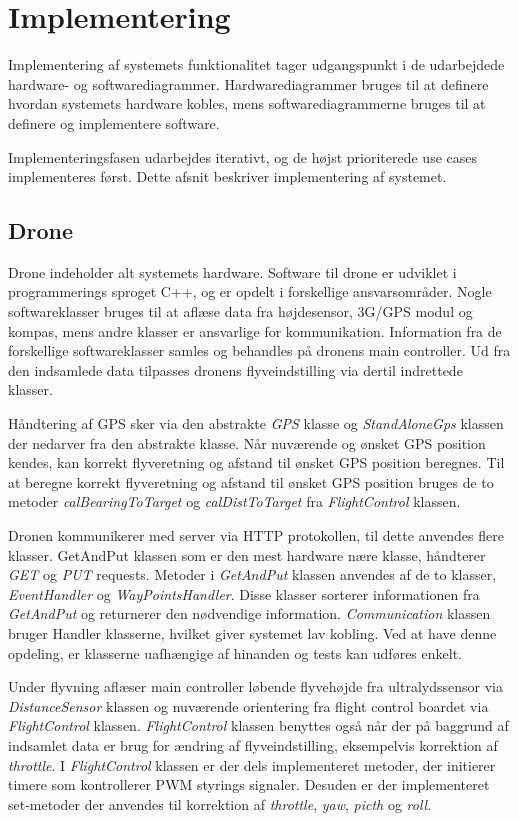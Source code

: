 \section{Implementering}
Implementering af systemets funktionalitet tager udgangspunkt i de udarbejdede hardware- og softwarediagrammer. Hardwarediagrammer bruges til at definere hvordan systemets hardware kobles, mens softwarediagrammerne bruges til at definere og implementere software.

Implementeringsfasen udarbejdes iterativt, og de højst prioriterede use cases implementeres først. 
Dette afsnit beskriver implementering af systemet.

\subsection{Drone}
Drone indeholder alt systemets hardware. Software til drone er udviklet i programmerings sproget C++, og er opdelt i forskellige ansvarsområder. Nogle softwareklasser bruges til at aflæse data fra højdesensor, 3G/GPS modul og kompas, mens andre klasser er ansvarlige for kommunikation. Information fra de forskellige softwareklasser samles og behandles på dronens main controller. Ud fra den indsamlede data tilpasses dronens flyveindstilling via dertil indrettede klasser. 

Håndtering af GPS sker via den abstrakte \textit{GPS} klasse og \textit{StandAloneGps} klassen der nedarver fra den abstrakte klasse. Når nuværende og ønsket GPS position kendes, kan korrekt flyveretning og afstand til ønsket GPS position beregnes. Til at beregne korrekt flyveretning og afstand til ønsket GPS position bruges de to metoder \textit{calBearingToTarget} og \textit{calDistToTarget} fra \textit{FlightControl} klassen. 

Dronen kommunikerer med server via HTTP protokollen, til dette anvendes flere klasser. GetAndPut klassen som er den mest hardware nære klasse, håndterer \textit{GET} og \textit{PUT} requests. Metoder i \textit{GetAndPut} klassen anvendes af de to klasser, \textit{EventHandler} og \textit{WayPointsHandler}. Disse klasser sorterer informationen fra \textit{GetAndPut} og returnerer den nødvendige information. \textit{Communication} klassen bruger Handler klasserne, hvilket giver systemet lav kobling. Ved at have denne opdeling, er klasserne uafhængige af hinanden og tests kan udføres enkelt.

Under flyvning aflæser main controller løbende flyvehøjde fra ultralydssensor via \textit{DistanceSensor} klassen og nuværende orientering fra flight control boardet via \textit{FlightControl} klassen. \textit{FlightControl} klassen benyttes også når der på baggrund af indsamlet data er brug for ændring af flyveindstilling, eksempelvis korrektion af \textit{throttle}. I \textit{FlightControl} klassen er der dels implementeret metoder, der initierer timere som kontrollerer PWM styrings signaler. Desuden er der implementeret set-metoder der anvendes til korrektion af \textit{throttle}, \textit{yaw}, \textit{picth} og \textit{roll}.  

